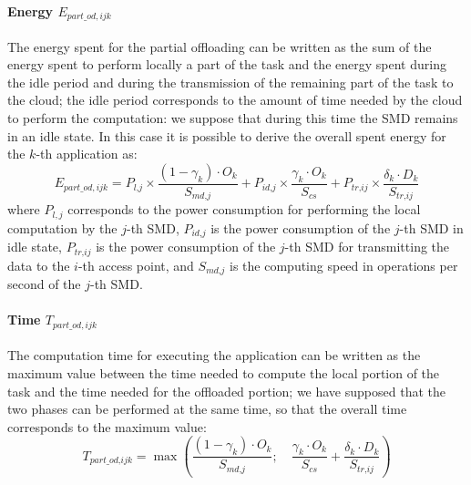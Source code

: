 \documentclass[twoside,openright]{report}
\begin{document}
\paragraph{Energy $E_{\textit{part}\_\textit{od},\textit{ijk}}$} The energy spent for the partial offloading can be written as the sum of the energy spent to perform locally a part of the task and the energy spent during the idle period and during the transmission of the remaining part of the task to the cloud; the idle period corresponds to the amount of time needed by the cloud to perform the computation: we suppose that during this time the \gls{SMD} remains in an idle state. 
In this case it is possible to derive the overall spent energy for the $k$-th application as:
	\begin{equation}
	E_{\textit{part}\_\textit{od},\textit{ijk}}  = P_{\textit{l,j}}\times\frac{(1-\gamma_{k})\cdot O_{k}}{S_{\textit{md,j}}} 
	+ P_{\textit{id,j}}\times\frac{\gamma_{k}\cdot O_{k}}{S_{\textit{cs}}} + P_{\textit{tr,ij}}\times\frac{\delta_{k}\cdot D_{k}}{S_{\textit{tr,ij}}}
	\label{E_ODpart}
	\end{equation}		
where $P_{l,j}$ corresponds to the power consumption for performing the local computation by the $j$-th \gls{SMD}, $P_{\textit{id,j}}$ is the power consumption of the $j$-th \gls{SMD} in idle state, $P_{\textit{tr,ij}}$ is the power consumption of the $j$-th \gls{SMD} for transmitting the data to the $i$-th access point, and $S_{\textit{md,j}}$ is the computing speed in operations per second of the $j$-th \gls{SMD}.

\paragraph{Time $T_{\textit{part}\_\textit{od},\textit{ijk}}$} The computation time for executing the application can be written as the maximum value between the time needed to compute the local portion of the task and the time needed for the offloaded portion; we have supposed that the two phases can be performed at the same time, so that the overall time corresponds to the maximum value:
\begin{equation}
\label{T_ODpart}	 
	T_{\textit{part}\_\textit{od,ijk}} = \max \left(\frac{(1-\gamma_{k})\cdot O_{k}}{S_{\textit{md,j}}};\quad\frac{\gamma_{k}\cdot O_{k}}{S_{\textit{cs}}} + \frac{\delta_{k}\cdot D_{k}}{S_{\textit{tr,ij}}}\right)
	\end{equation}
\end{document}
